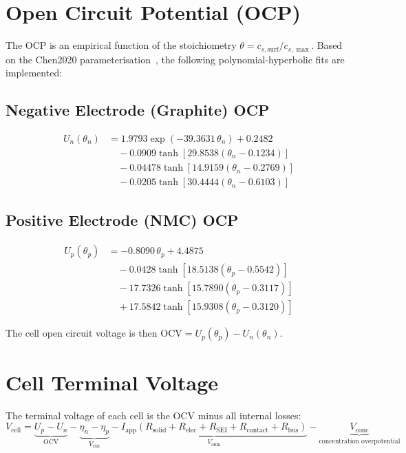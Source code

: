 \section{Open Circuit Potential (OCP)}
\label{sec:ocp}

The OCP is an empirical function of the stoichiometry $\theta = c_{s,\text{surf}}/c_{s,\max}$. Based on the Chen2020 parameterisation~\cite{Chen2020}, the following polynomial-hyperbolic fits are implemented:

\subsection{Negative Electrode (Graphite) OCP}
\begin{align}
  U_n(\theta_n) &= 1.9793\exp(-39.3631\,\theta_n) + 0.2482 \nonumber\\
  &\quad - 0.0909\tanh[29.8538(\theta_n - 0.1234)] \nonumber\\
  &\quad - 0.04478\tanh[14.9159(\theta_n - 0.2769)] \nonumber\\
  &\quad - 0.0205\tanh[30.4444(\theta_n - 0.6103)]
  \label{eq:ocp_n}
\end{align}

\subsection{Positive Electrode (NMC) OCP}
\begin{align}
  U_p(\theta_p) &= -0.8090\,\theta_p + 4.4875 \nonumber\\
  &\quad - 0.0428\tanh[18.5138(\theta_p - 0.5542)] \nonumber\\
  &\quad - 17.7326\tanh[15.7890(\theta_p - 0.3117)] \nonumber\\
  &\quad + 17.5842\tanh[15.9308(\theta_p - 0.3120)]
  \label{eq:ocp_p}
\end{align}

The cell open circuit voltage is then $\text{OCV} = U_p(\theta_p) - U_n(\theta_n)$.

\section{Cell Terminal Voltage}
\label{sec:terminal_voltage}

The terminal voltage of each cell is the OCV minus all internal losses:
\begin{equation}
  V_\text{cell} = \underbrace{U_p - U_n}_{\text{OCV}}
    - \underbrace{\eta_n - \eta_p}_{V_\text{rxn}}
    - \underbrace{I_\text{app}(R_\text{solid} + R_\text{elec} + R_\text{SEI} + R_\text{contact} + R_\text{bus})}_{V_\text{ohm}}
    - \underbrace{V_\text{conc}}_{\text{concentration overpotential}}
  \label{eq:terminal_voltage}
\end{equation}

